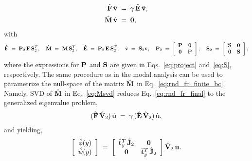 \documentclass[%
secnumarabic,%
 amssymb, amsmath,%
 aps,prf,superscriptaddress,longbibliography
frontmatterverbose,
]{revtex4-2}
\begin{document}
\begin{subequations}\label{eq:rnd_fr_final}
\begin{align}
  \hat {\mathbf{F}} \, \hat{\mathbf{v}} \;&=\; \gamma \,\hat{\mathbf{E}} \,\hat{\mathbf{v}},\\
  \hat{\mathbf{M}} \,\hat{\mathbf{v}} \;&=\; \mathbf 0,\label{eq:rnd_fr_finite_bc}
\end{align}
\end{subequations}
with
	$$
	\hat{\mathbf{F}} 
	\;=\;  
	\mathbf{P}_{2} \, \mathbf{F} \, \mathbf{S}_2^T, 
	\quad 
	\hat{\mathbf{M}} 
	\;=\;  
	\mathbf{M} \, \mathbf{S}_{2}^T, 
	\quad 
	\hat{\mathbf{E}} 
	\;=\;  
	\mathbf{P}_{2} \, \mathbf{E} \, \mathbf{S}_2^T, 
	\quad 
	\hat{\mathbf{v}} 
	\;=\; 
	\mathbf{S}_2 {\mathbf{v}},
	\quad
	\mathbf{P}_{2} 
	\;=\; 
	\left[\begin{array}{cc}
	\mathbf{P} & \mathbf 0  \\
	\mathbf 0 & \mathbf{P}
	\end{array}\right], 
	\quad  
	\mathbf{S}_{2} 
	\;=\; 
	\left[\begin{array}{cc}
  	\mathbf{S} & \mathbf 0\\
  	\mathbf 0 & \mathbf{S}
  	\end{array}\right],
	$$
where the expressions for $\mathbf{P}$ and $\mathbf{S}$ are given in Eqs.~\eqref{eq:project} and~\eqref{eq:S}, respectively. The same procedure as in the modal analysis can be used to parametrize the null-space of the matrix $\hat{\mathbf{M}}$ in Eq.~\eqref{eq:rnd_fr_finite_bc}. Namely, SVD of $\hat{\mathbf{M}}$ in Eq.~\eqref{eq:Msvd} reduces Eq.~\eqref{eq:rnd_fr_final} to the generalized eigenvalue problem,
\begin{align}
  (\hat{\mathbf{F}} \,\hat{\mathbf{V}}_{2})\,\hat{\mathbf{u}} \;=\; \gamma \,(\hat{\mathbf{E}}\, \hat{\mathbf{V}}_{2})\, \hat{\mathbf{u}},
\end{align}
and yielding,
\begin{align}
  \left[\begin{array}{c}
    \hat{\phi} (y)\\
    \hat{\psi} (y)
  \end{array}\right] 
  \; = \; 
  \left[\begin{array}{cc}
    \hat{\mathbf{t}}_y^T \, \hat{\mathbf{J}}_2 & \mathbf 0\\
    \mathbf 0 & \hat{\mathbf{t}}_y^T \, \hat{\mathbf{J}}_2
  \end{array}\right] \hat{\mathbf{V}}_{2} \, \mathbf{u}.
\end{align}     
\end{document}
